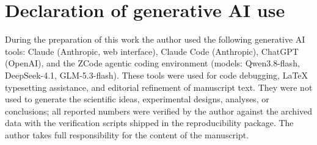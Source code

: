 \documentclass[10pt]{article}
\begin{document}
\section*{Declaration of generative AI use}
During the preparation of this work the author used the following generative AI tools: Claude (Anthropic, web interface), Claude Code (Anthropic), ChatGPT (OpenAI), and the ZCode agentic coding environment (models: Qwen3.8-flash, DeepSeek-4.1, GLM-5.3-flash). These tools were used for code debugging, \LaTeX{} typesetting assistance, and editorial refinement of manuscript text. They were not used to generate the scientific ideas, experimental designs, analyses, or conclusions; all reported numbers were verified by the author against the archived data with the verification scripts shipped in the reproducibility package. The author takes full responsibility for the content of the manuscript.



\end{document}
